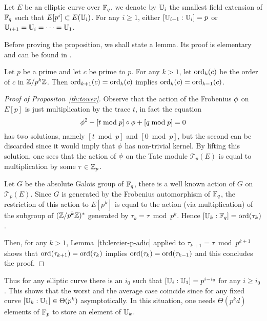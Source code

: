 \begin{proposition}
  \label{th:tower}
  Let $E$ be an elliptic curve over $\mathbb{F}_q$, we denote by $\mathbb{U}_i$ the
  smallest field extension of $\mathbb{F}_q$ such that $E[p^i]\subset
  E(\mathbb{U}_i)$. For any $i\ge1$, either $[\mathbb{U}_{i+1}:\mathbb{U}_i] = p$ or
  $\mathbb{U}_{i+1}=\mathbb{U}_i=\cdots=\mathbb{U}_1$.
\end{proposition}

Before proving the proposition, we shall state a lemma. Its proof is
elementary and can be found in \cite[$\S6.1$]{lercier-algorithmique}.

\begin{lemma}
  \label{th:lercier-p-adic}
  Let $p$ be a prime and let $c$ be prime to $p$. For any $k>1$, let
  $\operatorname{ord}_k(c)$ be the order of $c$ in $\mathbb{Z}/p^k\mathbb{Z}$. Then
  $\operatorname{ord}_{k+1}(c)=\operatorname{ord}_k(c)$ implies $\operatorname{ord}_k(c)=\operatorname{ord}_{k-1}(c)$.
\end{lemma}

\begin{proof}[Proof of Propositon~\ref{th:tower}]
  Observe that the action of the Frobenius $\phi$ on $E[p]$ is
  just multiplication by the trace $t$, in fact the equation
  \[\phi^2 - [t \bmod p]\circ\phi + [q \bmod p] = 0\]
  has two solutions, namely $[t \bmod p]$ and $[0 \bmod p]$, but the
  second can be discarded since it would imply that $\phi$ has
  non-trivial kernel.  By lifting this solution, one sees that the
  action of $\phi$ on the Tate module $\mathcal{T}_p(E)$ is equal
  to multiplication by some $\tau\in\mathbb{Z}_p$.

  Let $G$ be the absolute Galois group of $\mathbb{F}_q$, there is a well
  known action of $G$ on $\mathcal{T}_p(E)$. Since $G$ is generated by
  the Frobenius automorphism of $\mathbb{F}_q$, the restriction of this action
  to $E[p^k]$ is equal to the action (via multiplication) of the
  subgroup of $(\mathbb{Z}/p^k\mathbb{Z})^\ast$ generated by $\tau_k = \tau \bmod
  p^k$. Hence $[\mathbb{U}_k:\mathbb{F}_q] = \operatorname{ord}(\tau_k)$.

  Then, for any $k>1$, Lemma~\ref{th:lercier-p-adic} applied to
  $\tau_{k+1}=\tau\bmod p^{k+1}$ shows that
  $\operatorname{ord}(\tau_{k+1})=\operatorname{ord}(\tau_k)$ implies
  $\operatorname{ord}(\tau_k)=\operatorname{ord}(\tau_{k-1})$ and this concludes the proof.
\end{proof}


Thus for any elliptic curve there is an $i_0$ such that $[\mathbb{U}_i:\mathbb{U}_1] =
p^{i-i_0}$ for any $i \ge i_0$. This shows that the worst and the
average case coincide since for any fixed curve $[\mathbb{U}_k:\mathbb{U}_1] \in
\Theta(p^k)$ asymptotically. In this situation, one needs
$\Theta(p^kd)$ elements of $\mathbb{F}_p$ to store an element of $\mathbb{U}_k$.

